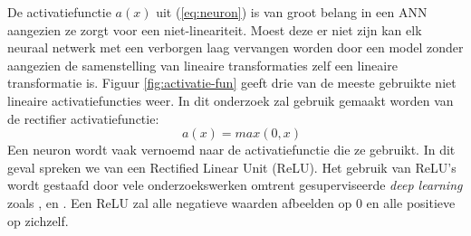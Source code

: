 \npar De activatiefunctie $a(x)$ uit (\ref{eq:neuron}) is van groot belang in een ANN aangezien ze zorgt voor een niet-lineariteit. Moest deze er niet zijn kan elk neuraal netwerk met een verborgen laag vervangen worden door een model zonder aangezien de samenstelling van lineaire transformaties zelf een lineaire transformatie is. Figuur \ref{fig:activatie-fun} geeft drie van de meeste gebruikte niet lineaire activatiefuncties weer. In dit onderzoek zal gebruik gemaakt worden van de rectifier activatiefunctie:
\begin{equation}
\quad a(x) = max(0,x)
\end{equation}
Een neuron wordt vaak vernoemd naar de activatiefunctie die ze gebruikt. In dit geval spreken we van een Rectified Linear Unit (ReLU). Het gebruik van ReLU's wordt gestaafd door vele onderzoekswerken omtrent gesuperviseerde \textit{deep learning} zoals \cite{ReLU}, \cite{lionel} en \cite{wu_deep_2016}. Een ReLU zal alle negatieve waarden afbeelden op 0 en alle positieve op zichzelf.

